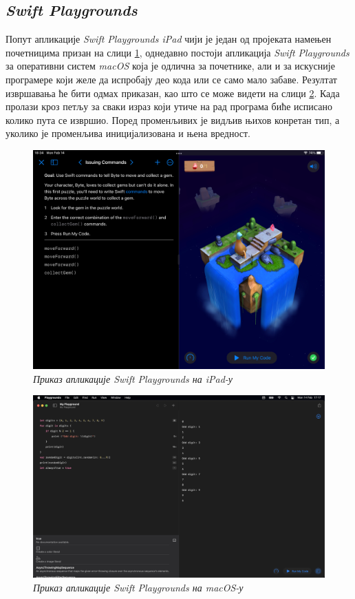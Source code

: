 \documentclass[12pt,oneside]{memoir}
\begin{document}
\subsection{\textit{Swift Playgrounds}}
\indent Попут апликације \textit{Swift Playgrounds iPad} чији је један од пројеката намењен почетницима призан на слици \ref{slika:swift_playground_ipad}, однедавно постоји апликација \textit{Swift Playgrounds} за оперативни систем \textit{macOS} која је одлична за почетнике, али и за искусније програмере који желе да испробају део кода или се само мало забаве. Резултат извршавања ће бити одмах приказан, као што се може видети на слици \ref{slika:swift_playground_macos}. Када пролази кроз петљу за сваки израз који утиче на рад програма биће исписано колико пута се извршио. Поред променљивих је видљив њихов конретан тип, а уколико је променљива иницијализована и њена вредност.

\begin{figure}[H]
\includegraphics[width=1\textwidth]{images/Swift_Playground_iPad.jpeg}
\centering
\caption{\textit{Приказ апликације Swift Playgrounds на iPad-у}}
\label{slika:swift_playground_ipad}
\end{figure}

\begin{figure}[H]
\includegraphics[width=1\textwidth]{images/Swift_Playground_macOS.png}
\centering
\caption{\textit{Приказ апликације Swift Playgrounds на macOS-у}}
\label{slika:swift_playground_macos}
\end{figure}
\end{document}
